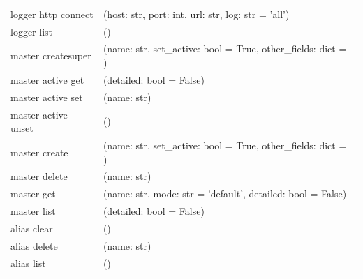 {\begin{longtable}{l p{10cm}}
        logger http connect                 & (host: str, port: int, url: str, log: str = 'all')                                                                    \\
        logger list                         & ()                                                                                                                    \\
        master createsuper                  & (name: str, set\_active: bool = True, other\_fields: dict = {})                                                       \\
        master active get                   & (detailed: bool = False)                                                                                              \\
        master active set                   & (name: str)                                                                                                           \\
        master active unset                 & ()                                                                                                                    \\
        master create                       & (name: str, set\_active: bool = True, other\_fields: dict = {})                                                       \\
        master delete                       & (name: str)                                                                                                           \\
        master get                          & (name: str, mode: str = 'default', detailed: bool = False)                                                            \\
        master list                         & (detailed: bool = False)                                                                                              \\
        alias clear                         & ()                                                                                                                    \\
        alias delete                        & (name: str)                                                                                                           \\
        alias list                          & ()                                                                                                                    \\

\end{longtable}}
